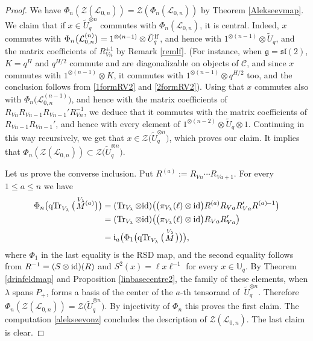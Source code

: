 \documentclass[pdftex]{sigma}%
\numberwithin{equation}{section}
\numberwithin{figure}{section}
\newcommand{\mUq}{\mathbb{U}_q}
\newcommand{\Ll}{{\mathcal L}}
\begin{document}
\begin{proof}
We have $\Phi_n(\mathcal{Z}(\Ll_{0,n})) = \mathcal{Z}(\Phi_n(\Ll_{0,n}))$ by Theorem \ref{Alekseevmap}. We claim that if $x\in \tilde U_q^{\otimes n}$ commutes with $\Phi_n(\Ll_{0,n})$, it is central. Indeed, $x$ commutes with $\Phi_n\big(\Ll_{0,n}^{(n)}\big)=1^{\otimes (n-1)} \otimes \tilde U_q^{\rm lf}$, and hence with $1^{\otimes (n-1)} \otimes \tilde U_q$, and the matrix coefficients of $R_{Vn}^{\pm 1}$ by Remark \ref{remlf}. (For instance, when $\mathfrak{g}={\mathfrak{sl}}(2)$, $K=q^H$ and $q^{H/2}$ commute and are diagonalizable on objects of $\mathcal{C}$, and since $x$ commutes with $1^{\otimes (n-1)} \otimes K$, it commutes with $1^{\otimes (n-1)} \otimes q^{H/2}$ too, and the conclusion follows from \eqref{1formRV2} and \eqref{2formRV2}). Using that $x$ commutes also with $\Phi_n\big(\Ll_{0,n}^{(n-1)}\big)$, and hence with the matrix coefficients of $R_{Vn} R_{Vn-1}R_{Vn-1}'R_{Vn}^{-1}$, we deduce that it commutes with the matrix coefficients of $R_{Vn-1}R_{Vn-1}'$, and hence with every element of $1^{\otimes (n-2)} \otimes \tilde U_q \otimes 1$. Continuing in this way recursively, we get that $x\in \mathcal{Z}\big(\tilde U_q^{\otimes n}\big)$, which proves our claim. It implies that $\Phi_n(\mathcal{Z}(\Ll_{0,n}))\subset \mathcal{Z}\big(\tilde U_q^{\otimes n}\big)$.

Let us prove the converse inclusion. Put $R^{(a)}:=R_{Vn}\cdots R_{Va+1}$. For every $1\leq a\leq n$ we have
\begin{align}
\Phi_n\big(\!\operatorname{qTr}_{V_\lambda}\big(\!\stackrel{V_\lambda}{M}{}^{\!\! (a)} \big)\big) & = (\operatorname{Tr}_{V_{\lambda}}\otimes {\rm id} )\big(\big(\pi_{V_{\lambda}}(\ell)\otimes {\rm id} \big)R^{(a)}R_{Va}R_{Va}'R^{(a)}{}^{\!-1}\big) \nonumber
\\
& = (\operatorname{Tr}_{V_{\lambda}}\otimes {\rm id} )\big(\big(\pi_{V_{\lambda}}(\ell)\otimes {\rm id} \big)R_{Va}R_{Va}'\big)\nonumber
\\
& = \mathfrak{i}_a\big(\Phi_1\big(\!\operatorname{qTr}_{V_{\lambda}} \big(\!\stackrel{V_\lambda}{M}\!\big)\big)\big),\label{alekseevonz}
 \end{align}
where $\Phi_1$ in the last equality is the RSD map, and the second equality follows from $R^{-1} = (S\otimes {\rm id} )(R)$ and $S^2(x) = \ell x \ell^{-1}$ for every $x\in \mUq$. By Theorem \ref{drinfeldmap} and Proposition \ref{linbasecentre2}, the family of these elements, when $\lambda$ spans $P_+$, forms a basis of the center of the $a$-th tensorand of~$\tilde U_q^{\otimes n}$. Therefore $\Phi_n(\mathcal{Z}(\Ll_{0,n}))= \mathcal{Z}\big(\tilde U_q^{\otimes n}\big)$. By injectivity of $\Phi_n$ this proves the first claim. The computation \eqref{alekseevonz} concludes the description of $\mathcal{Z}(\Ll_{0,n})$. The last claim is clear.\end{proof}
\end{document}
